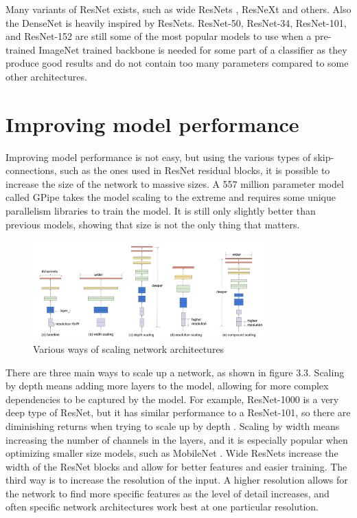 Many variants of ResNet exists, such as wide ResNets \citep{wideResNet}, ResNeXt \citep{resNext} and others. Also the DenseNet \citep{denseNet} is heavily inspired by ResNets. ResNet-50, ResNet-34, ResNet-101, and ResNet-152 are still some of the most popular models to use when a pre-trained ImageNet trained backbone is needed for some part of a classifier as they produce good results and do not contain too many parameters compared to some other architectures.

\section{Improving model performance}
Improving model performance is not easy, but using the various types of skip-connections, such as the ones used in ResNet residual blocks, it is possible to increase the size of the network to massive sizes. A 557 million parameter model called GPipe \citep{gPipe} takes the model scaling to the extreme and requires some unique parallelism libraries to train the model. It is still only slightly better than previous models, showing that size is not the only thing that matters.

\begin{figure}[h!] 
\centering 
\includegraphics[width=0.8\textwidth]{imgs/scaling-networks.png}
\caption{Various ways of scaling network architectures \citep{efficientNet}}
\end{figure}

There are three main ways to scale up a network, as shown in figure 3.3. Scaling by depth means adding more layers to the model, allowing for more complex dependencies to be captured by the model. For example, ResNet-1000 is a very deep type of ResNet, but it has similar performance to a ResNet-101, so there are diminishing returns when trying to scale up by depth \citep{efficientNet}. Scaling by width means increasing the number of channels in the layers, and it is especially popular when optimizing smaller size models, such as MobileNet \citep{mobileNet}. Wide ResNets \citep{wideResNet} increase the width of the ResNet blocks and allow for better features and easier training. The third way is to increase the resolution of the input. A higher resolution allows for the network to find more specific features as the level of detail increases, and often specific network architectures work best at one particular resolution.

